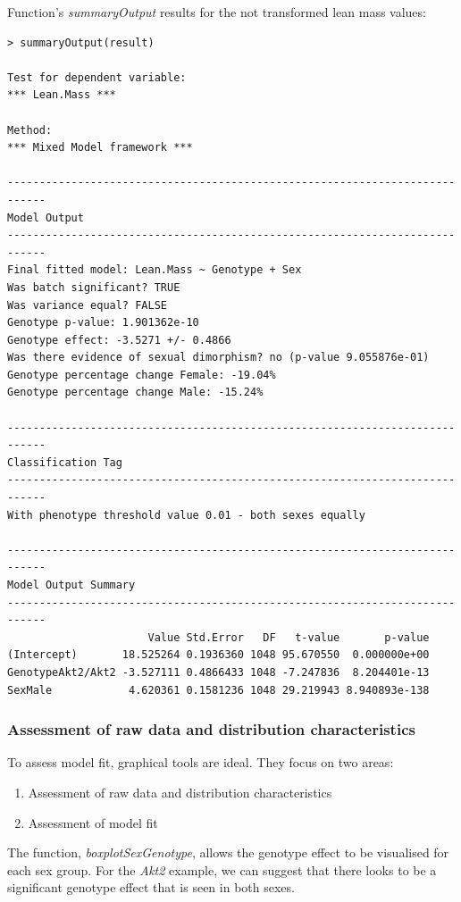 \documentclass[12pt,a4paper]{article}
\begin{document}
Function's \textit{summaryOutput} results for the not transformed lean mass values:
\begingroup
    \fontsize{8pt}{12pt}\selectfont
\begin{verbatim}
> summaryOutput(result)

Test for dependent variable:
*** Lean.Mass ***

Method:
*** Mixed Model framework ***

----------------------------------------------------------------------------
Model Output
----------------------------------------------------------------------------
Final fitted model: Lean.Mass ~ Genotype + Sex
Was batch significant? TRUE
Was variance equal? FALSE
Genotype p-value: 1.901362e-10
Genotype effect: -3.5271 +/- 0.4866
Was there evidence of sexual dimorphism? no (p-value 9.055876e-01)
Genotype percentage change Female: -19.04%
Genotype percentage change Male: -15.24%

----------------------------------------------------------------------------
Classification Tag
----------------------------------------------------------------------------
With phenotype threshold value 0.01 - both sexes equally

----------------------------------------------------------------------------
Model Output Summary
----------------------------------------------------------------------------
                      Value Std.Error   DF   t-value       p-value
(Intercept)       18.525264 0.1936360 1048 95.670550  0.000000e+00
GenotypeAkt2/Akt2 -3.527111 0.4866433 1048 -7.247836  8.204401e-13
SexMale            4.620361 0.1581236 1048 29.219943 8.940893e-138
\end{verbatim}
\endgroup 
\subsubsection{Assessment of raw data and distribution characteristics}
To assess model fit, graphical tools are ideal.  They focus on two areas:
\begin{enumerate}
 \item Assessment of raw data and distribution characteristics
 \item Assessment of model fit
\end{enumerate}
\label{AssesingModelFit}

The function, \textit{boxplotSexGenotype}, allows the genotype effect to be visualised for each sex group. 
For the \textit{Akt2} example, we can suggest that there looks to be a significant genotype effect that is seen in both sexes. 
\end{document}
